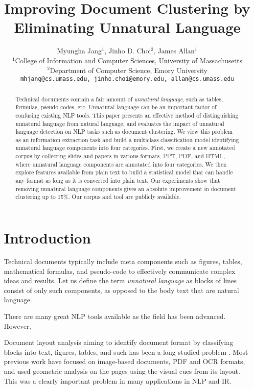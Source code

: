 \documentclass[11pt,letterpaper]{article}
\title{Improving Document Clustering by Eliminating Unnatural Language}
\author{Myungha Jang$^{1}$, Jinho D. Choi$^{2}$, James Allan$^{1}$\\
	    $^{1}$College of Information and Computer Sciences, University of Massachusetts \\
	    $^{2}$Department of Computer Science, Emory University\\
	    {\tt mhjang@cs.umass.edu, jinho.choi@emory.edu, allan@cs.umass.edu}
}
\date{}
\begin{document}
\maketitle

\begin{abstract}
Technical documents contain a fair amount of \textit{unnatural language}, such as tables, formulas, pseudo-codes, etc. 
Unnatural language can be an important factor of confusing existing NLP tools.
This paper presents an effective method of distinguishing unnatural language from natural language, and evaluates the impact of unnatural language detection on NLP tasks such as document clustering.
We view this problem as an information extraction task and build a multiclass classification model identifying unnatural language components into four categories.
First, we create a new annotated corpus by collecting slides and papers in various formats, PPT, PDF, and HTML, where unnatural language components are annotated into four categories.
We then explore features available from plain text to build a statistical model that can handle any format as long as it is converted into plain text.
Our experiments show that removing unnatural language components gives an absolute improvement in document clustering up to 15\%.
Our corpus and tool are publicly available.

\end{abstract}

\section{Introduction}

Technical documents typically include meta components such as figures, tables, mathematical formulas, and pseudo-code to effectively communicate complex ideas and results. Let us define the term \emph{unnatural language} as blocks of lines consist of only such components, as opposed to the body text that are natural language.

There are many great NLP tools available as the field has been advanced. However, 

Document layout analysis aiming to identify document format by classifying blocks into text, figures, tables, and such has been a long-studied problem \cite{gorman,simon}. 
Most previous work have focused on image-based documents, PDF and OCR formats, and used geometric analysis on the pages using the visual cues from its layout. This was a clearly important problem in many applications in NLP and IR.
\end{document}
